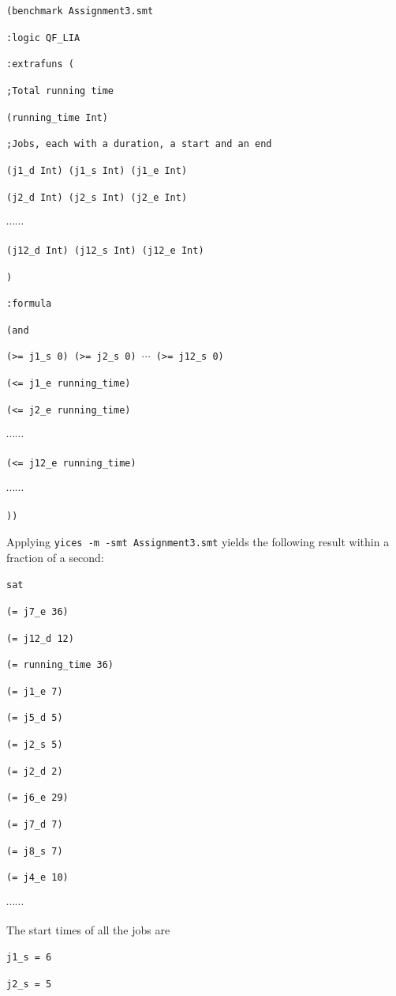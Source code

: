 \documentclass[a4paper]{article}
\begin{document}
{\footnotesize

{\tt (benchmark Assignment3.smt}

{\tt :logic QF\_LIA}

{\tt :extrafuns (}

{\tt ;Total running time }

{\tt (running\_time Int) }

{\tt ;Jobs, each with a duration, a start and an end }

{\tt (j1\_d Int) (j1\_s Int) (j1\_e Int) }
 
{\tt (j2\_d Int) (j2\_s Int) (j2\_e Int) }
 
$\cdots \cdots$
 
{\tt (j12\_d Int) (j12\_s Int) (j12\_e Int) }

{\tt )}

{\tt :formula}

{\tt   (and}

{\tt (>= j1\_s 0) (>= j2\_s 0) $\cdots$ (>= j12\_s 0) }

{\tt (<= j1\_e running\_time) }

{\tt (<= j2\_e running\_time) }

$\cdots \cdots$

{\tt (<= j12\_e running\_time) }

$\cdots \cdots$

{\tt )) }
}

Applying {\tt yices -m -smt Assignment3.smt} yields the following result
within a fraction of a second:

{\footnotesize

{\tt sat }

{\tt (= j7\_e 36) }

{\tt (= j12\_d 12) }

{\tt (= running\_time 36) }

{\tt (= j1\_e 7) }

{\tt (= j5\_d 5) }

{\tt (= j2\_s 5) }

{\tt (= j2\_d 2) }

{\tt (= j6\_e 29) }

{\tt (= j7\_d 7) }

{\tt (= j8\_s 7) }

{\tt (= j4\_e 10) }

$\cdots \cdots$ }

The start times of all the jobs are 

{\tt j1\_s = 6 }

{\tt j2\_s = 5 }
\end{document}

